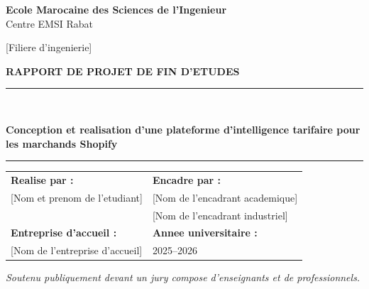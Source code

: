 \documentclass[12pt,a4paper,oneside]{report}
\newcommand{\studentName}{\textcolor{placeholderRed}{[Nom et prenom de l'etudiant]}}
\newcommand{\programName}{\textcolor{placeholderRed}{[Filiere d'ingenierie]}}
\newcommand{\academicAdvisor}{\textcolor{placeholderRed}{[Nom de l'encadrant academique]}}
\newcommand{\industryAdvisor}{\textcolor{placeholderRed}{[Nom de l'encadrant industriel]}}
\newcommand{\hostCompany}{\textcolor{placeholderRed}{[Nom de l'entreprise d'accueil]}}
\newcommand{\academicYear}{2025--2026}
\newcommand{\reportTitle}{Conception et realisation d'une plateforme d'intelligence tarifaire pour les marchands Shopify}
\begin{document}
\begin{titlepage}
  \thispagestyle{empty}
  \begin{center}
    \begin{minipage}[t]{0.38\textwidth}
      \centering
    \end{minipage}
    \hfill
    \begin{minipage}[t]{0.38\textwidth}
      \centering
    \end{minipage}

    \vspace{1.2cm}
    {\Large\bfseries Ecole Marocaine des Sciences de l'Ingenieur\\[0.15cm]}
    {\large Centre EMSI Rabat\\[0.5cm]}
    {\large \programName\par}

    \vfill
    {\fontsize{18}{22}\selectfont\bfseries RAPPORT DE PROJET DE FIN D'ETUDES\par}
    \vspace{0.8cm}
    \rule{\textwidth}{0.8pt}\\[0.45cm]
    {\fontsize{18}{23}\selectfont\bfseries\color{emsiBlue}\reportTitle\par}
    \vspace{0.45cm}
    \rule{\textwidth}{0.8pt}
    \vfill

    \begin{tabularx}{\textwidth}{@{}Y Y@{}}
      \textbf{Realise par :} & \textbf{Encadre par :} \\
      \studentName & \academicAdvisor \\
      & \industryAdvisor \\
      \addlinespace[0.45cm]
      \textbf{Entreprise d'accueil :} & \textbf{Annee universitaire :} \\
      \hostCompany & \academicYear \\
    \end{tabularx}

    \vfill
    \textit{Soutenu publiquement devant un jury compose d'enseignants et de professionnels.}
  \end{center}
\end{titlepage}
\end{document}
